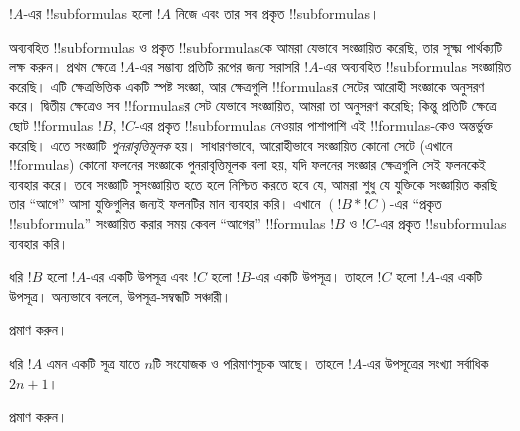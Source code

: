 \documentclass[../../../include/open-logic-section]{subfiles}
\begin{document}
\begin{defn}[!!^{subformula}]
$!A$-এর !!{subformula}s হলো $!A$ নিজে এবং তার সব প্রকৃত
!!{subformula}s।
\end{defn}

\begin{explain}
অব্যবহিত !!{subformula}s ও প্রকৃত !!{subformula}sকে আমরা যেভাবে
সংজ্ঞায়িত করেছি, তার সূক্ষ্ম পার্থক্যটি লক্ষ করুন। প্রথম ক্ষেত্রে
$!A$-এর সম্ভাব্য প্রতিটি রূপের জন্য সরাসরি $!A$-এর অব্যবহিত
!!{subformula}s সংজ্ঞায়িত করেছি। এটি ক্ষেত্রভিত্তিক একটি স্পষ্ট
সংজ্ঞা, আর ক্ষেত্রগুলি !!{formula}sর সেটের আরোহী সংজ্ঞাকে অনুসরণ
করে। দ্বিতীয় ক্ষেত্রেও সব !!{formula}sর সেট যেভাবে সংজ্ঞায়িত,
আমরা তা অনুসরণ করেছি; কিন্তু প্রতিটি ক্ষেত্রে ছোট !!{formula}s $!B$,
$!C$-এর প্রকৃত !!{subformula}s নেওয়ার পাশাপাশি এই !!{formula}s-কেও
অন্তর্ভুক্ত করেছি। এতে সংজ্ঞাটি \emph{পুনরাবৃত্তিমূলক} হয়। সাধারণভাবে, আরোহীভাবে
সংজ্ঞায়িত কোনো সেটে (এখানে !!{formula}s) কোনো ফলনের সংজ্ঞাকে
পুনরাবৃত্তিমূলক বলা হয়, যদি ফলনের সংজ্ঞার ক্ষেত্রগুলি সেই ফলনকেই
ব্যবহার করে। তবে সংজ্ঞাটি সুসংজ্ঞায়িত হতে হলে নিশ্চিত করতে হবে যে,
আমরা শুধু যে যুক্তিকে সংজ্ঞায়িত করছি তার “আগে” আসা যুক্তিগুলির জন্যই
ফলনটির মান ব্যবহার করি। এখানে $(!B \ast !C)$-এর “প্রকৃত
!!{subformula}” সংজ্ঞায়িত করার সময় কেবল “আগের” !!{formula}s $!B$ ও
$!C$-এর প্রকৃত !!{subformula}s ব্যবহার করি।
\end{explain}

\begin{prop}
ধরি $!B$ হলো $!A$-এর একটি উপসূত্র এবং $!C$ হলো $!B$-এর একটি উপসূত্র।
তাহলে $!C$ হলো $!A$-এর একটি উপসূত্র। অন্যভাবে বললে, উপসূত্র-সম্বন্ধটি
সঞ্চারী।
\end{prop}

\begin{prob}
 প্রমাণ করুন।
\end{prob}

\begin{prop}
ধরি $!A$ এমন একটি সূত্র যাতে $n$টি সংযোজক ও পরিমাণসূচক আছে।
তাহলে $!A$-এর উপসূত্রের সংখ্যা সর্বাধিক $2n+1$।
\end{prop}

\begin{prob}
 প্রমাণ করুন।
\end{prob}
\end{document}
